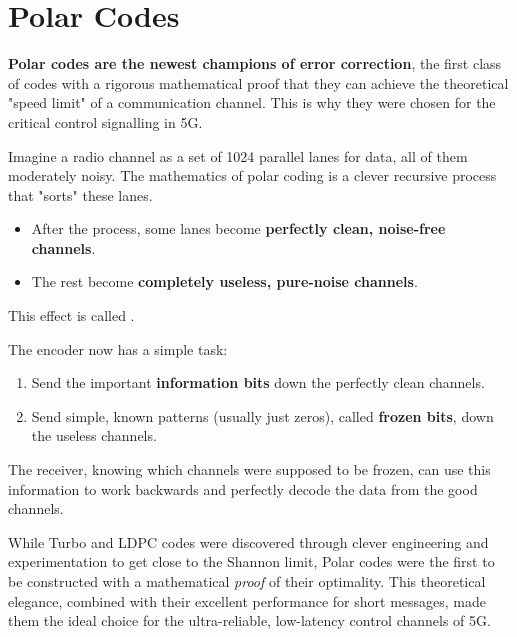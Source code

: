 
\chapter{Polar Codes}
\label{ch:polar-codes}

\begin{nontechnical}
    \textbf{Polar codes are the newest champions of error correction}, the first class of codes with a rigorous mathematical proof that they can achieve the theoretical "speed limit" of a communication channel. This is why they were chosen for the critical control signalling in 5G.

    Imagine a radio channel as a set of 1024 parallel lanes for data, all of them moderately noisy. The mathematics of polar coding is a clever recursive process that "sorts" these lanes.
    \begin{itemize}
        \item After the process, some lanes become \textbf{perfectly clean, noise-free channels}.
        \item The rest become \textbf{completely useless, pure-noise channels}.
    \end{itemize}
    This effect is called .

    The encoder now has a simple task:
    \begin{enumerate}
        \item Send the important \textbf{information bits} down the perfectly clean channels.
        \item Send simple, known patterns (usually just zeros), called \textbf{frozen bits}, down the useless channels.
    \end{enumerate}
    The receiver, knowing which channels were supposed to be frozen, can use this information to work backwards and perfectly decode the data from the good channels.

     While Turbo and LDPC codes were discovered through clever engineering and experimentation to get close to the Shannon limit, Polar codes were the first to be constructed with a mathematical \emph{proof} of their optimality. This theoretical elegance, combined with their excellent performance for short messages, made them the ideal choice for the ultra-reliable, low-latency control channels of 5G.
\end{nontechnical}


